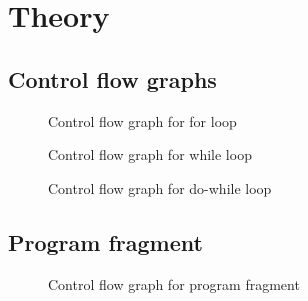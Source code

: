 \section{Theory}

\subsection{Control flow graphs}
\begin{figure}[h]
    \centering
    
    \caption{Control flow graph for for loop}
    \label{fig:cfg_for}
\end{figure}

\begin{figure}[h]
    \centering
    
    \caption{Control flow graph for while loop}
    \label{fig:cfg_while}
\end{figure}

\begin{figure}[h]
    \centering
    
    \caption{Control flow graph for do-while loop}
    \label{fig:cfg_do_while}
\end{figure}
\clearpage
\subsection{Program fragment}

\begin{figure}[h]
    \centering
    
    \caption{Control flow graph for program fragment}
    \label{fig:cfg_program}
\end{figure}
